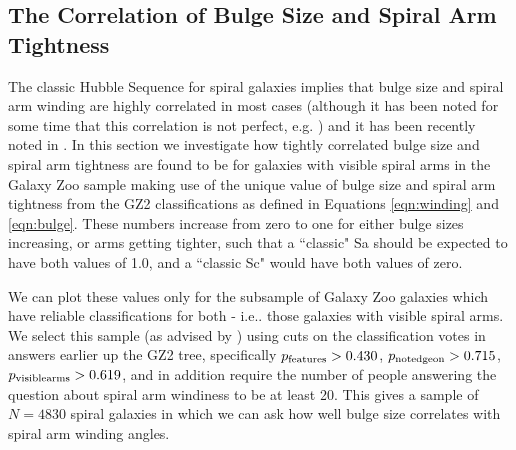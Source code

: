 \documentclass[usenatbib]{mn2e}
\begin{document}

\subsection{The Correlation of Bulge Size and Spiral Arm Tightness}

The classic Hubble Sequence for spiral galaxies implies that bulge size and spiral arm winding are highly correlated in most cases (although it has been noted for some time that this correlation is not perfect, e.g. \citealt{1970ApJ...160..811F, kennicutt1981}) and it has been recently noted in \citet[][but see \citealt{Davis2015} who do claim to see a strong trend]{Hart2017b,Hart2018}. In this section we investigate how tightly correlated bulge size and spiral arm tightness are found to be for galaxies with visible spiral arms in the Galaxy Zoo sample making use of the unique value of bulge size and spiral arm tightness from the GZ2 classifications as defined in Equations \ref{eqn:winding} and \ref{eqn:bulge}. These numbers increase from zero to one for either bulge sizes increasing, or arms getting tighter, such that a ``classic" Sa should be expected to have both values of 1.0, and a ``classic Sc" would have both values of zero.  

We can plot these values only for the subsample of Galaxy Zoo galaxies which have reliable classifications for both - i.e.. those galaxies with visible spiral arms. We select this sample (as advised by \citealt{Willett2013}) using cuts on the classification votes in answers earlier up the GZ2 tree, specifically $p_{\rm features} > 0.430$, $p_{\rm notedgeon} > 0.715$, $p_{\rm visiblearms} > 0.619$, and in addition require the number of people answering the question about spiral arm windiness to be at least 20. This gives a sample of $N = 4830$ spiral galaxies in which we can ask how well bulge size correlates with spiral arm winding angles.
 
\end{document}
